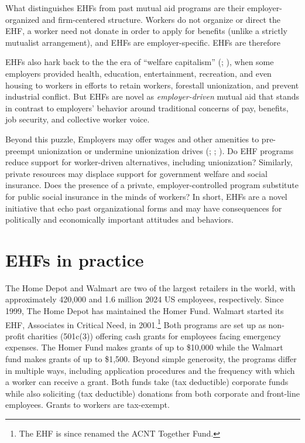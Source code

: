 \documentclass[
  11pt,
  oneside]{article}
\begin{document}
What distinguishes EHFs from past mutual aid programs are their employer-organized and firm-centered structure. Workers do not organize or direct the EHF, a worker need not donate in order to apply for benefits (unlike a strictly mutualist arrangement), and EHFs are employer-specific. EHFs are therefore

EHFs also hark back to the the era of ``welfare capitalism'' (; ), when some employers provided health, education, entertainment, recreation, and even housing to workers in efforts to retain workers, forestall unionization, and prevent industrial conflict. But EHFs are novel as \emph{employer-driven} mutual aid that stands in contrast to employers' behavior around traditional concerns of pay, benefits, job security, and collective worker voice.

Beyond this puzzle, Employers may offer wages and other amenities to pre-preempt unionization or undermine unionization drives (; ; ). Do EHF programs reduce support for worker-driven alternatives, including unionization? Similarly, private resources may displace support for government welfare and social insurance. Does the presence of a private, employer-controlled program substitute for public social insurance in the minds of workers? In short, EHFs are a novel initiative that echo past organizational forms and may have consequences for politically and economically important attitudes and behaviors.

\section{EHFs in practice}\label{ehfs-in-practice}

The Home Depot and Walmart are two of the largest retailers in the world, with approximately 420,000 and 1.6 million 2024 US employees, respectively. Since 1999, The Home Depot has maintained the Homer Fund. Walmart started its EHF, Associates in Critical Need, in 2001.\footnote{The EHF is since renamed the ACNT Together Fund.} Both programs are set up as non-profit charities (501c(3)) offering cash grants for employees facing emergency expenses. The Homer Fund makes grants of up to \$10,000 while the Walmart fund makes grants of up to \$1,500. Beyond simple generosity, the programs differ in multiple ways, including application procedures and the frequency with which a worker can receive a grant. Both funds take (tax deductible) corporate funds while also soliciting (tax deductible) donations from both corporate and front-line employees. Grants to workers are tax-exempt.
\end{document}
